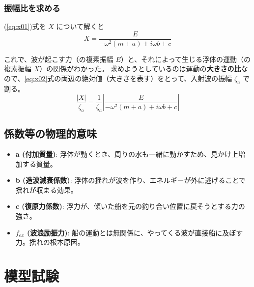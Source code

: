 \documentclass[dvipdfmx,a4paper]{jreport} %
\begin{document}
\subsection{振幅比を求める}
    
    (\ref{eq:x01})式を $X$ について解くと
    \begin{equation}
    \label{eq:x02}
        X = \frac{E}{-\omega^2(m+a) + i\omega b + c}
    \end{equation}

    これで、波が起こす力（の複素振幅 $E$）と、それによって生じる浮体の運動（の複素振幅 $X$）の関係がわかった。
    求めようとしているのは運動の\textbf{大きさの比}なので、\ref{eq:x02}式の両辺の絶対値（大きさを表す）をとって、入射波の振幅 $\zeta_a$ で割る。
    \begin{equation}
        \frac{|X|}{\zeta_a} = \frac{1}{\zeta_a} \left| \frac{E}{-\omega^2(m+a) + i\omega b + c} \right|
    \end{equation}

\section{係数等の物理的意味}
\begin{itemize}
    \item \textbf{a (付加質量)}: 浮体が動くとき、周りの水も一緒に動かすため、見かけ上増加する質量。
    \item \textbf{b (造波減衰係数)}: 浮体の揺れが波を作り、エネルギーが外に逃げることで揺れが収まる効果。
    \item \textbf{c (復原力係数)}: 浮力が、傾いた船を元の釣り合い位置に戻そうとする力の強さ。
    \item \textbf{$f_{ex}$ (波浪励振力)}: 船の運動とは無関係に、やってくる波が直接船に及ぼす力。揺れの根本原因。
\end{itemize}

\chapter{模型試験}
\end{document}
